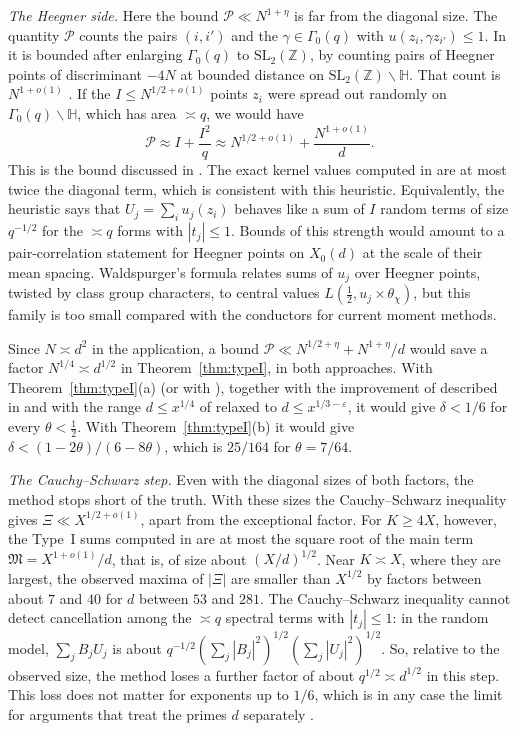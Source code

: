 \documentclass[11pt]{amsart}
\theoremstyle{remark}
\theoremstyle{definition}
\numberwithin{equation}{section}
\newcommand{\Pc}{\mathcal{P}}
\newcommand{\Z}{\mathbb{Z}}
\newcommand{\Hb}{\mathbb{H}}
\newcommand{\eps}{\varepsilon}
\newcommand{\SL}{\mathrm{SL}}
\begin{document}
\emph{The Heegner side.} Here the bound $\Pc\ll N^{1+\eta}$ is far from the diagonal size. The quantity $\Pc$ counts the pairs $(i,i')$ and the $\gamma\in\Gamma_0(q)$ with $u(z_i,\gamma z_{i'})\le1$. In \cite[Lemma~6.4]{II} it is bounded after enlarging $\Gamma_0(q)$ to $\SL_2(\Z)$, by counting pairs of Heegner points of discriminant $-4N$ at bounded distance on $\SL_2(\Z)\backslash\Hb$. That count is $N^{1+o(1)}$ \cite[Remark~8.1]{II}. If the $I\le N^{1/2+o(1)}$ points $z_i$ were spread out randomly on $\Gamma_0(q)\backslash\Hb$, which has area $\asymp q$, we would have
\[
\Pc\approx I+\frac{I^2}{q}\approx N^{1/2+o(1)}+\frac{N^{1+o(1)}}{d}.
\]
This is the bound discussed in \cite[Remark~8.1]{II}. The exact kernel values computed in \cite[\S9]{II} are at most twice the diagonal term, which is consistent with this heuristic. Equivalently, the heuristic says that $U_j=\sum_iu_j(z_i)$ behaves like a sum of $I$ random terms of size $q^{-1/2}$ for the $\asymp q$ forms with $|t_j|\le1$. Bounds of this strength would amount to a pair-correlation statement for Heegner points on $X_0(d)$ at the scale of their mean spacing. Waldspurger's formula relates sums of $u_j$ over Heegner points, twisted by class group characters, to central values $L(\frac12,u_j\times\theta_\chi)$, but this family is too small compared with the conductors for current moment methods.

Since $N\asymp d^2$ in the application, a bound $\Pc\ll N^{1/2+\eta}+N^{1+\eta}/d$ would save a factor $N^{1/4}\asymp d^{1/2}$ in Theorem~\ref{thm:typeI}, in both approaches. With Theorem~\ref{thm:typeI}(a) (or with \cite{GM1}), together with the improvement of \cite[Lemma~7.2]{II} described in \cite[Remark~8.1]{II} and with the range $d\le x^{1/4}$ of \cite[(7.1)]{II} relaxed to $d\le x^{1/3-\eps}$, it would give $\delta<1/6$ for every $\theta<\frac12$. With Theorem~\ref{thm:typeI}(b) it would give $\delta<(1-2\theta)/(6-8\theta)$, which is $25/164$ for $\theta=7/64$.

\emph{The Cauchy--Schwarz step.} Even with the diagonal sizes of both factors, the method stops short of the truth. With these sizes the Cauchy--Schwarz inequality gives $\Xi\ll X^{1/2+o(1)}$, apart from the exceptional factor. For $K\ge4X$, however, the Type~I sums computed in \cite[\S9]{II} are at most the square root of the main term $\mathfrak M=X^{1+o(1)}/d$, that is, of size about $(X/d)^{1/2}$. Near $K\asymp X$, where they are largest, the observed maxima of $|\Xi|$ are smaller than $X^{1/2}$ by factors between about $7$ and $40$ for $d$ between $53$ and $281$. The Cauchy--Schwarz inequality cannot detect cancellation among the $\asymp q$ spectral terms with $|t_j|\le1$: in the random model, $\sum_jB_jU_j$ is about $q^{-1/2}(\sum_j|B_j|^2)^{1/2}(\sum_j|U_j|^2)^{1/2}$. So, relative to the observed size, the method loses a further factor of about $q^{1/2}\asymp d^{1/2}$ in this step. This loss does not matter for exponents up to $1/6$, which is in any case the limit for arguments that treat the primes $d$ separately \cite[Remark~8.1]{II}.
\end{document}

